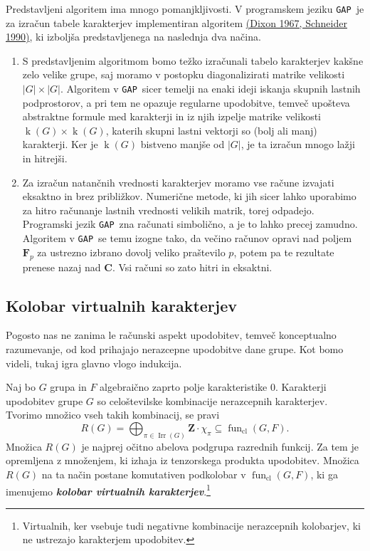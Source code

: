 \documentclass[11pt]{book}
\def\ZZ{\mathbf{Z}}
\def\CC{\mathbf{C}}
\def\FF{\mathbf{F}}
\DeclareMathOperator\Irr{Irr}
\DeclareMathOperator\kk{k}
\DeclareMathOperator\cl{cl}
\def\GAP{\texttt{GAP}}
\DeclareMathOperator\fun{fun}
\def\definicija{\color{rdeca}\bf\em}
\theoremstyle{definition}
\theoremstyle{zgled}
\theoremstyle{odprtproblem}
\theoremstyle{domacanaloga}
\theoremstyle{izrek}
\begin{document}
Predstavljeni algoritem ima mnogo pomanjkljivosti. V programskem jeziku \GAP~je za izračun tabele karakterjev implementiran algoritem \href{https://www.sciencedirect.com/science/article/pii/S0747717108800776}{(Dixon 1967, Schneider 1990)}, ki izboljša predstavljenega na naslednja dva načina.
\begin{enumerate}
    \item S predstavljenim algoritmom bomo težko izračunali tabelo karakterjev kakšne zelo velike grupe, saj moramo v postopku diagonalizirati matrike velikosti $|G| \times |G|$. Algoritem v \GAP~sicer temelji na enaki ideji iskanja skupnih lastnih podprostorov, a pri tem ne opazuje regularne upodobitve, temveč upošteva abstraktne formule med karakterji in iz njih izpelje matrike velikosti $\kk(G) \times \kk(G)$, katerih skupni lastni vektorji so (bolj ali manj) karakterji. Ker je $\kk(G)$ bistveno manjše od $|G|$, je ta izračun mnogo lažji in hitrejši.
    
    \item Za izračun natančnih vrednosti karakterjev moramo vse račune izvajati eksaktno in brez približkov. Numerične metode, ki jih sicer lahko uporabimo za hitro računanje lastnih vrednosti velikih matrik, torej odpadejo. Programski jezik \GAP~zna računati simbolično, a je to lahko precej zamudno. Algoritem v \GAP~se temu izogne tako, da večino računov opravi nad poljem $\FF_p$ za ustrezno izbrano dovolj veliko praštevilo $p$, potem pa te rezultate prenese nazaj nad $\CC$. Vsi računi so zato hitri in eksaktni.
\end{enumerate}

\subsection{Kolobar virtualnih karakterjev}

Pogosto nas ne zanima le računski aspekt upodobitev, temveč konceptualno razumevanje, od kod prihajajo nerazcepne upodobitve dane grupe. Kot bomo videli, tukaj igra glavno vlogo indukcija.

Naj bo $G$ grupa in $F$ algebraično zaprto polje karakteristike $0$. Karakterji upodobitev grupe $G$ so celoštevilske kombinacije nerazcepnih karakterjev. Tvorimo množico vseh takih kombinacij, se pravi
\[
    R(G) = \bigoplus_{\pi \in \Irr(G)} \ZZ \cdot \chi_{\pi} \subseteq \textstyle \fun_{\cl}(G, F).
\]  
Množica $R(G)$ je najprej očitno abelova podgrupa razrednih funkcij. Za tem je opremljena z množenjem, ki izhaja iz tenzorskega produkta upodobitev. Množica $R(G)$ na ta način postane komutativen podkolobar v $\fun_{\cl}(G,F)$, ki ga imenujemo {\definicija kolobar virtualnih karakterjev}.\footnote{Virtualnih, ker vsebuje tudi negativne kombinacije nerazcepnih kolobarjev, ki ne ustrezajo karakterjem upodobitev.}
\end{document}

